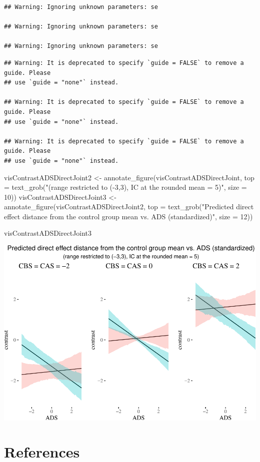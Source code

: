 \documentclass[
  10pt,
  dvipsnames,enabledeprecatedfontcommands]{scrartcl}
\newenvironment{Shaded}{\begin{snugshade}}{\end{snugshade}}
\newcommand{\AttributeTok}[1]{\textcolor[rgb]{0.77,0.63,0.00}{#1}}
\newcommand{\DecValTok}[1]{\textcolor[rgb]{0.00,0.00,0.81}{#1}}
\newcommand{\FunctionTok}[1]{\textcolor[rgb]{0.00,0.00,0.00}{#1}}
\newcommand{\NormalTok}[1]{#1}
\newcommand{\OtherTok}[1]{\textcolor[rgb]{0.56,0.35,0.01}{#1}}
\newcommand{\StringTok}[1]{\textcolor[rgb]{0.31,0.60,0.02}{#1}}
\begin{document}
\begin{verbatim}
## Warning: Ignoring unknown parameters: se

## Warning: Ignoring unknown parameters: se

## Warning: Ignoring unknown parameters: se
\end{verbatim}

\begin{verbatim}
## Warning: It is deprecated to specify `guide = FALSE` to remove a guide. Please
## use `guide = "none"` instead.

## Warning: It is deprecated to specify `guide = FALSE` to remove a guide. Please
## use `guide = "none"` instead.

## Warning: It is deprecated to specify `guide = FALSE` to remove a guide. Please
## use `guide = "none"` instead.
\end{verbatim}

\begin{Shaded}
\begin{Highlighting}[]
\NormalTok{visContrastADSDirectJoint2 }\OtherTok{\textless{}{-}} \FunctionTok{annotate\_figure}\NormalTok{(visContrastADSDirectJoint, }
                                        \AttributeTok{top =} \FunctionTok{text\_grob}\NormalTok{(}\StringTok{"(range restricted to ({-}3,3), IC at the rounded mean = 5)"}\NormalTok{,}
                                                        \AttributeTok{size =} \DecValTok{10}\NormalTok{))}
\NormalTok{visContrastADSDirectJoint3 }\OtherTok{\textless{}{-}} \FunctionTok{annotate\_figure}\NormalTok{(visContrastADSDirectJoint2, }
                                        \AttributeTok{top =} \FunctionTok{text\_grob}\NormalTok{(}\StringTok{"Predicted direct effect distance from the control group mean vs. ADS (standardized)"}\NormalTok{,}
                                                        \AttributeTok{size =} \DecValTok{12}\NormalTok{))}

\NormalTok{visContrastADSDirectJoint3}
\end{Highlighting}
\end{Shaded}

\begin{center}\includegraphics[width=1\linewidth]{bayesianReport3_files/figure-latex/unnamed-chunk-19-1} \end{center}
\normalsize

\hypertarget{references}{%
\section*{References}\label{references}}

\vspace{-3mm}
\end{document}
